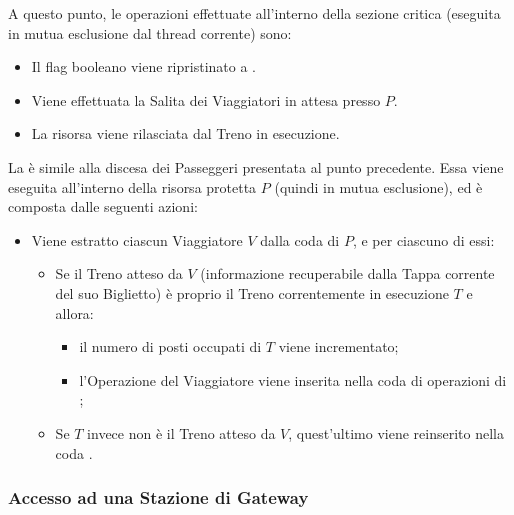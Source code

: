 \begin{description}
		A questo punto, le operazioni effettuate all'interno della sezione critica (eseguita in mutua esclusione dal thread corrente) sono:
		
			\begin{itemize}
				\item Il flag booleano  viene ripristinato a .
				\item Viene effettuata la Salita dei Viaggiatori in attesa presso $P$.
				\item La risorsa viene rilasciata dal Treno in esecuzione. 
			\end{itemize}
		
		La  è simile alla discesa dei Passeggeri presentata al punto precedente. Essa viene eseguita all'interno della risorsa protetta $P$ (quindi in mutua esclusione), ed è composta dalle seguenti azioni:
		\begin{itemize}
			\item Viene estratto ciascun Viaggiatore $V$ dalla coda  di $P$, e per ciascuno di essi:
			\begin{itemize}
				\item Se il Treno atteso da $V$ (informazione recuperabile dalla Tappa corrente del suo Biglietto) è proprio il Treno correntemente in esecuzione $T$ e  allora:
					\begin{itemize}
						\item il numero di posti occupati di $T$ viene incrementato;
						\item l'Operazione  del Viaggiatore viene inserita nella coda di operazioni di ;
					\end{itemize}
				\item Se $T$ invece non è il Treno atteso da $V$, quest'ultimo viene reinserito nella coda .
			\end {itemize}
		\end{itemize}
	\end {description}


	\subsubsection{Accesso ad una Stazione di Gateway}\label{subsubsec:gateway_stations_func}
	
